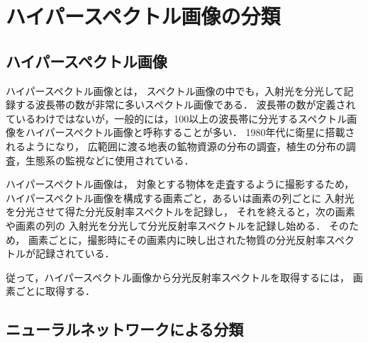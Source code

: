 \clearpage


\section{ハイパースペクトル画像の分類}
\label{sec:ClassificationOfHyperspectralImage}

\subsection{ハイパースペクトル画像}
\label{ssec:HyperspectralImage}

ハイパースペクトル画像とは，
スペクトル画像の中でも，入射光を分光して記録する波長帯の数が非常に多いスペクトル画像である\cite{横矢2014}．
波長帯の数が定義されているわけではないが，一般的には，100以上の波長帯に分光するスペクトル画像をハイパースペクトル画像と呼称することが多い．%
1980年代に衛星に搭載されるようになり，
広範囲に渡る地表の鉱物資源の分布の調査，植生の分布の調査，生態系の監視などに使用されている\cite{Underwood2003}\cite{Kruse2003}\cite{Ustin2004}\cite{Haboudane2004}\cite{Clark2005}．%

ハイパースペクトル画像は，
対象とする物体を走査するように撮影するため，
ハイパースペクトル画像を構成する画素ごと，あるいは画素の列ごとに%
入射光を分光させて得た分光反射率スペクトルを記録し，
それを終えると，次の画素や画素の列の
入射光を分光して分光反射率スペクトルを記録し始める．
そのため，
画素ごとに，撮影時にその画素内に映し出された物質の分光反射率スペクトルが記録されている．

従って，ハイパースペクトル画像から分光反射率スペクトルを取得するには，
画素ごとに取得する．

\clearpage

\subsection{ニューラルネットワークによる分類}
\label{ssec:NeuralNetWork}

